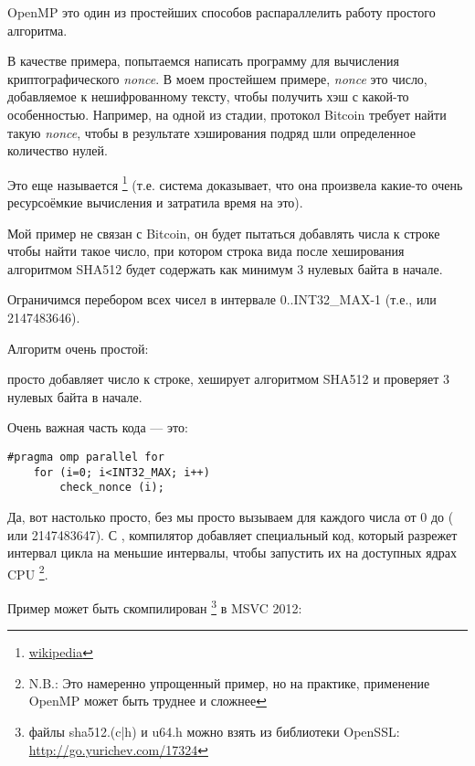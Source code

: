 \label{openmp}

OpenMP это один из простейших способов распараллелить работу простого алгоритма.

В качестве примера, попытаемся написать программу для вычисления криптографического \emph{nonce}.
В моем простейшем примере, \emph{nonce} это число, добавляемое к нешифрованному тексту, чтобы получить
хэш с какой-то особенностью.
Например, на одной из стадии, протокол Bitcoin требует найти такую \emph{nonce}, чтобы в результате
хэширования подряд шли определенное количество нулей.

Это еще называется 
\footnote{\href{http://go.yurichev.com/17100}{wikipedia}} 
(т.е. система доказывает, что она произвела какие-то очень ресурсоёмкие вычисления и затратила
время на это).

Мой пример не связан с Bitcoin, 
он будет пытаться добавлять числа к строке 
чтобы найти такое число, при котором строка вида 
 после хеширования алгоритмом SHA512 будет содержать как минимум 3 нулевых
байта в начале.

Ограничимся перебором всех чисел в интервале
0..INT32\_MAX-1 (т.е.,  или 2147483646).

Алгоритм очень простой:



 просто добавляет число к строке, хеширует алгоритмом SHA512 и проверяет 
3 нулевых байта в начале.

Очень важная часть кода --- это:

\begin{lstlisting}[style=customc]
	#pragma omp parallel for
	for (i=0; i<INT32_MAX; i++)
		check_nonce (i);
\end{lstlisting}

Да, вот настолько просто, без  мы просто вызываем
  для каждого числа от 0 до 
 ( или 2147483647).
С , компилятор добавляет специальный код, который разрежет интервал цикла
на меньшие интервалы, чтобы запустить их на доступных ядрах \ac{CPU}
\footnote{N.B.: Это намеренно упрощенный пример, но на практике, 
применение OpenMP может быть труднее и сложнее}.

Пример может быть скомпилирован
\footnote{файлы sha512.(c|h) и u64.h можно взять из библиотеки OpenSSL:
\url{http://go.yurichev.com/17324}}
в MSVC 2012:

